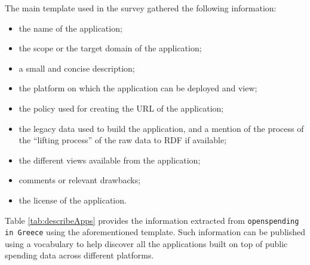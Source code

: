 The main template used in the survey gathered the following information:
\begin{itemize}
\item the name of the application;
\item the scope or the target domain of the application;
\item a small and concise description;
\item the platform on which the application can be deployed and view;
\item the policy used for creating the URL of the application;
\item the legacy data used to build the application, and a mention of the process of the ``lifting process'' of the raw data to RDF if available;
\item the different views available from the application;
\item comments or relevant drawbacks;
\item the license of the application.
\end{itemize}
 Table \ref{tab:describeApps} provides the information extracted from \texttt{openspending in Greece} using the aforementioned template. Such information can be published using a vocabulary to help discover all the applications built on top of public spending data across different platforms.






